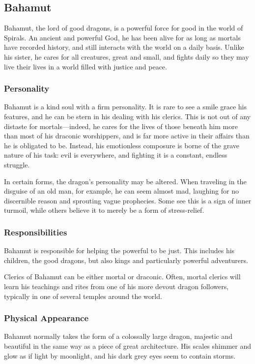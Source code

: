 \subsection*{Bahamut}
\begin{goddesc}
\end{goddesc}
Bahamut, the lord of good dragons, is a powerful force for good in the world of Spirals.
An ancient and powerful God, he has been alive for as long as mortals have recorded history, and still interacts with the world on a daily basis.
Unlike his sister, he cares for all creatures, great and small, and fights daily so they may live their lives in a world filled with justice and peace.

\subsubsection*{Personality}
Bahamut is a kind soul with a firm personality.
It is rare to see a smile grace his features, and he can be stern in his dealing with his clerics.
This is not out of any distaste for mortals---indeed, he cares for the lives of those beneath him more than most of his draconic worshippers, and is far more active in their affairs than he is obligated to be.
Instead, his emotionless composure is borne of the grave nature of his task: evil is everywhere, and fighting it is a constant, endless struggle.

In certain forms, the dragon's personality may be altered.
When traveling in the disguise of an old man, for example, he can seem almost mad, laughing for no discernible reason and sprouting vague prophecies.
Some see this is a sign of inner turmoil, while others believe it to merely be a form of stress-relief.

\subsubsection*{Responsibilities}
Bahamut is responsible for helping the powerful to be just.
This includes his children, the good dragons, but also kings and particularly powerful adventurers.

Clerics of Bahamut can be either mortal or draconic.
Often, mortal clerics will learn his teachings and rites from one of his more devout dragon followers, typically in one of several temples around the world.

\subsubsection*{Physical Appearance}
Bahamut normally takes the form of a colossally large dragon, majestic and beautiful in the same way as a piece of great architecture.
His scales shimmer and glow as if light by moonlight, and his dark grey eyes seem to contain storms.

